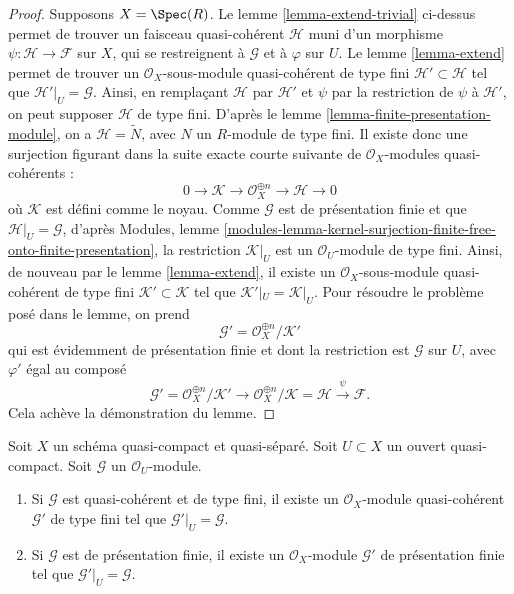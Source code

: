 \begin{proof}
\medskip\noindent
Supposons $X = \Spec(R)$.
Le lemme \ref{lemma-extend-trivial} ci-dessus permet
de trouver un faisceau quasi-cohérent $\mathcal{H}$ muni
d'un morphisme $\psi : \mathcal{H} \to \mathcal{F}$ sur $X$,
qui se restreignent à $\mathcal{G}$ et à $\varphi$ sur $U$.
Le lemme \ref{lemma-extend} permet de
trouver un $\mathcal{O}_X$-sous-module quasi-cohérent de type fini
$\mathcal{H}' \subset \mathcal{H}$
tel que $\mathcal{H}'|_U = \mathcal{G}$. Ainsi, en
remplaçant $\mathcal{H}$ par $\mathcal{H}'$
et $\psi$ par la restriction de $\psi$ à $\mathcal{H}'$,
on peut supposer $\mathcal{H}$ de type fini. D'après
le lemme \ref{lemma-finite-presentation-module},
on a $\mathcal{H} = \widetilde{N}$, avec
$N$ un $R$-module de type fini. Il existe donc une
surjection figurant dans la suite exacte
courte suivante de $\mathcal{O}_X$-modules quasi-cohérents :
$$
0 \to \mathcal{K} \to \mathcal{O}_X^{\oplus n} \to \mathcal{H} \to 0
$$
où $\mathcal{K}$ est défini comme le noyau.
Comme $\mathcal{G}$ est de présentation finie et que
$\mathcal{H}|_U = \mathcal{G}$,
d'après Modules, lemme
\ref{modules-lemma-kernel-surjection-finite-free-onto-finite-presentation},
la restriction $\mathcal{K}|_U$ est
un $\mathcal{O}_U$-module de type fini. Ainsi, de nouveau par le lemme \ref{lemma-extend},
il existe un
$\mathcal{O}_X$-sous-module quasi-cohérent de type fini $\mathcal{K}' \subset \mathcal{K}$ tel
que $\mathcal{K}'|_U = \mathcal{K}|_U$. Pour résoudre le problème
posé dans le lemme, on prend
$$
\mathcal{G}' = \mathcal{O}_X^{\oplus n}/\mathcal{K}'
$$
qui est évidemment de présentation finie et dont la restriction est $\mathcal{G}$
sur $U$, avec $\varphi'$ égal au composé
$$
\mathcal{G}' = \mathcal{O}_X^{\oplus n}/\mathcal{K}'
\to \mathcal{O}_X^{\oplus n}/\mathcal{K} = \mathcal{H} \xrightarrow{\psi}
\mathcal{F}.
$$
Cela achève la démonstration du lemme.
\end{proof}

\begin{lemma}
\label{lemma-lift-finite-presentation}
Soit $X$ un schéma quasi-compact et quasi-séparé. Soit $U \subset X$
un ouvert quasi-compact. Soit $\mathcal{G}$ un $\mathcal{O}_U$-module.
\begin{enumerate}
\item Si $\mathcal{G}$ est quasi-cohérent et de
type fini, il existe un $\mathcal{O}_X$-module quasi-cohérent $\mathcal{G}'$
de type fini tel que $\mathcal{G}'|_U = \mathcal{G}$.
\item Si $\mathcal{G}$ est de présentation finie,
il existe un $\mathcal{O}_X$-module $\mathcal{G}'$
de présentation finie tel que $\mathcal{G}'|_U = \mathcal{G}$.
\end{enumerate}
\end{lemma}

